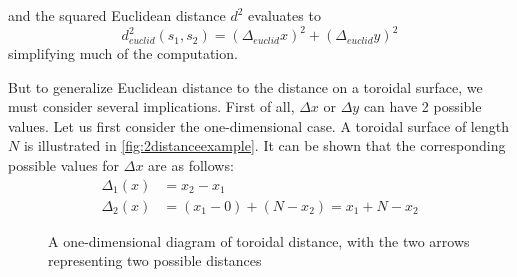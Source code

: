 and the squared Euclidean distance $d^2$ evaluates to
\begin{equation}
    d_{euclid}^2(s_1,s_2)=(\Delta_{euclid} x)^2+(\Delta_{euclid} y)^2
    \label{eq:squaredEuclid}
\end{equation}
simplifying much of the computation.

But to generalize Euclidean distance to the distance on a toroidal surface, we must consider several implications. First of all, $\Delta x$ or $\Delta y$ can have 2 possible values. Let us first consider the one-dimensional case. A toroidal surface of length $N$ is illustrated in \autoref{fig:2distanceexample}. It can be shown that the corresponding possible values for $\Delta x$ are as follows:
\begin{align*}
    \Delta_1(x)&=x_2-x_1 \\
    \Delta_2(x)&=(x_1-0)+(N-x_2)=x_1+N-x_2
\end{align*}

\begin{figure}[tpb]
    \centering
    \caption{A one-dimensional diagram of toroidal distance, with the two arrows representing two possible distances}%
    \label{fig:2distanceexample}
\end{figure}


